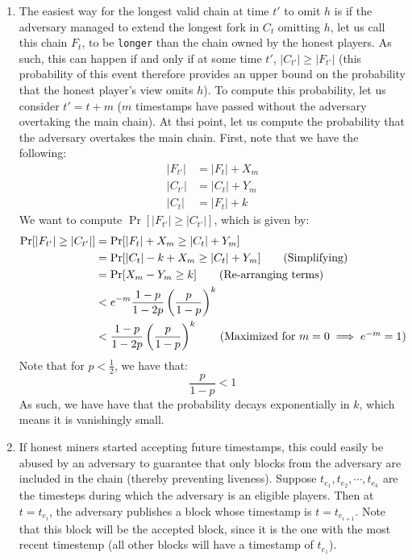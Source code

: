 \documentclass[12pt]{exam}
\begin{document}
\begin{questions}
\begin{solution}
\begin{enumerate}[label=\textbf{\alph*.}]
    \item
      The easiest way for the longest valid chain at time $t'$ to omit $h$ is if the adversary managed to extend the longest fork in $C_t$ omitting $h$, let us call this chain $F_t$, to be \texttt{longer} than the chain owned by the honest players. As such, this can happen if and only if at some time $t'$, $|C_{t'}| \geq |F_{t'}|$ (this probability of this event therefore provides an upper bound on the probability that the honest player's view omits $h$). To compute this probability, let us consider $t' = t + m$ ($m$ timestamps have passed without the adversary overtaking the main chain). At thsi point, let us compute the probability that the adversary overtakes the main chain. First, note that we have the following:
      \begin{align*}
        |F_{t'}| &= |F_{t}| + X_m \tag{$X_m$ as given in the problem} \\
        |C_{t'}| &= |C_{t}| + Y_m \tag{$Y_m$ as given in the problem} \\
        |C_t| &= |F_{t}| + k \tag{As given in the problem}
      \end{align*}
      We want to compute $\Pr[|F_{t'}| \geq |C_{t'}|]$, which is given by:
      \begin{align*}
        \Pr[|F_{t'}| \geq |C_{t'}|] &= \Pr[|F_{t}| + X_m \geq |C_{t}| + Y_m] \\
        &= \Pr[|C_{t}| - k + X_m \geq |C_{t}| + Y_m] \tag{Simplifying} \\
        &= \Pr[X_m  - Y_m \geq k ] \tag{Re-arranging terms} \\
        &< e^{-m} \frac{1-p}{1-2p}\left(\frac{p}{1-p} \right)^k \\
        &< \frac{1-p}{1-2p}\left(\frac{p}{1-p}\right)^k  \tag{Maximized for $m = 0 \implies e^{-m} = 1$} \\
      \end{align*}
      Note that for $p < \frac{1}{2}$, we have that:
      \[
        \frac{p}{1-p} < 1
      \]
      As such, we have have that the probability decays exponentially in $k$, which means it is vanishingly small.
    \item
      If honest miners started accepting future timestamps, this could easily be abused by an adversary to guarantee that only blocks from the adversary are included in the chain (thereby preventing liveness). Suppose $t_{e_1}, t_{e_2}, \cdots, t_{e_k}$ are the timesteps during which the adversary is an eligible players. Then at $t=t_{e_i}$, the adversary publishes a block whose timestamp is $t=t_{e_{i+1}}$. Note that this block will be the accepted block, since it is the one with the most recent timestemp (all other blocks will have a timestamp of $t_{e_1}$).


\end{enumerate}
\end{solution}
\end{questions}
\end{document}
